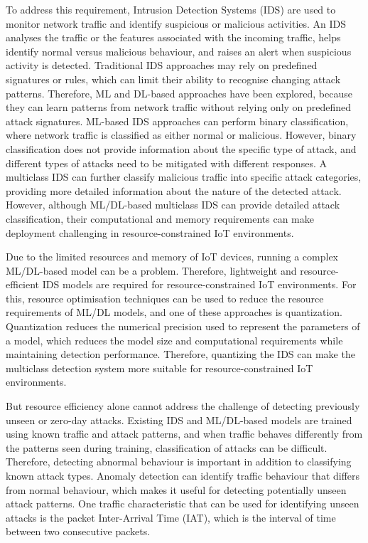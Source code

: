 \documentclass[]{interact}
\theoremstyle{plain}%
\theoremstyle{definition}
\theoremstyle{remark}
\begin{document}
To address this requirement, Intrusion Detection Systems (IDS) are used to monitor network traffic and identify suspicious or malicious activities. An IDS analyses the traffic or the features associated with the incoming traffic\cite{abdulganiyu2023systematic}, helps identify normal versus malicious behaviour, and raises an alert when suspicious activity is detected. Traditional IDS approaches may rely on predefined signatures or rules, which can limit their ability to recognise changing attack patterns\cite{khraisat2019survey}. Therefore, ML and DL-based approaches have been explored, because they can learn patterns from network traffic without relying only on predefined attack signatures\cite{rakine2025comprehensive}. ML-based IDS approaches can perform binary classification, where network traffic is classified as either normal or malicious. However, binary classification does not provide information about the specific type of attack\cite{palshikar2022distinguishes}, and different types of attacks need to be mitigated with different responses. A multiclass IDS can further classify malicious traffic into specific attack categories, providing more detailed information about the nature of the detected attack. However, although ML/DL-based multiclass IDS can provide detailed attack classification, their computational and memory requirements can make deployment challenging in resource-constrained IoT environments\cite{mallidi2025advancements}.

Due to the limited resources and memory of IoT devices, running a complex ML/DL-based model can be a problem. Therefore, lightweight and resource-efficient IDS models are required for resource-constrained IoT environments\cite{arshad2020intrusion}. For this, resource optimisation techniques can be used to reduce the resource requirements of ML/DL models, and one of these approaches is quantization\cite{gholami2022survey}. Quantization reduces the numerical precision used to represent the parameters of a model, which reduces the model size and computational requirements while maintaining detection performance. Therefore, quantizing the IDS can make the multiclass detection system more suitable for resource-constrained IoT environments\cite{misrak2025lightweight}.

But resource efficiency alone cannot address the challenge of detecting previously unseen or zero-day attacks\cite{el2024advanced}. Existing IDS and ML/DL-based models are trained using known traffic and attack patterns, and when traffic behaves differently from the patterns seen during training\cite{sabeel2021building}, classification of attacks can be difficult. Therefore, detecting abnormal behaviour is important in addition to classifying known attack types. Anomaly detection can identify traffic behaviour that differs from normal behaviour, which makes it useful for detecting potentially unseen attack patterns. One traffic characteristic that can be used for identifying unseen attacks is the packet Inter-Arrival Time (IAT), which is the interval of time between two consecutive packets\cite{sahin2025leveraging}.
\end{document}
